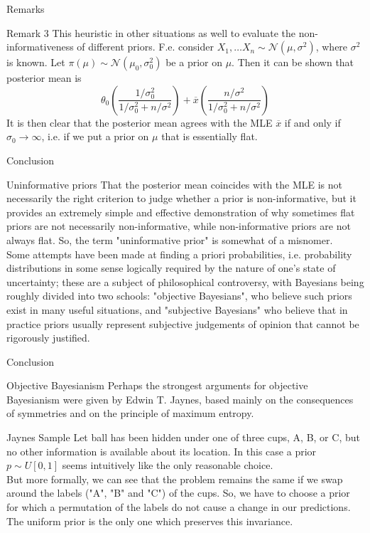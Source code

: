 \documentclass{beamer}
\begin{document}
\begin{frame}{Remarks}
    \begin{block}{Remark 3}
        This heuristic in other situations as well to evaluate the non-informativeness of different priors. F.e. consider $X_1, \ldots X_n \sim \mathcal{N}(\mu, \sigma^2)$, where $\sigma^2$ is known. Let $\pi(\mu) \sim \mathcal{N}(\mu_0, \sigma_0^2)$ be a prior on $\mu$. Then it can be shown that posterior mean is
        \[\theta_0 \left(\dfrac{1 / \sigma^2_0}{1 / \sigma^2_0 + n / \sigma^2}\right) + \overline{x} \left(\dfrac{n / \sigma^2}{1 / \sigma^2_0 + n / \sigma^2}\right)\]
        It is then clear that the posterior mean agrees with the MLE $\overline{x}$ if and only if $\sigma_0 \to \infty$, i.e. if we put a prior on $\mu$ that is essentially flat. 
    \end{block}
\end{frame}

\begin{frame}{Conclusion}
    \begin{block}{Uninformative priors}
        That the posterior mean coincides with the MLE is not necessarily the right criterion to judge whether a prior is non-informative, but it provides an extremely simple and effective demonstration of why sometimes flat priors are not necessarily non-informative, while non-informative priors are not always flat. So, the term "uninformative prior" is somewhat of a misnomer. \\
        Some attempts have been made at finding a priori probabilities, i.e. probability distributions in some sense logically required by the nature of one's state of uncertainty; these are a subject of philosophical controversy, with Bayesians being roughly divided into two schools: "objective Bayesians", who believe such priors exist in many useful situations, and "subjective Bayesians" who believe that in practice priors usually represent subjective judgements of opinion that cannot be rigorously justified.
    \end{block}
\end{frame}

\begin{frame}{Conclusion}
    \begin{block}{Objective Bayesianism}
        Perhaps the strongest arguments for objective Bayesianism were given by Edwin T. Jaynes, based mainly on the consequences of symmetries and on the principle of maximum entropy.
    \end{block}
    \begin{block}{Jaynes Sample}
        Let ball has been hidden under one of three cups, A, B, or C, but no other information is available about its location. In this case a prior $p \sim U[0, 1]$ seems intuitively like the only reasonable choice. \\
        But more formally, we can see that the problem remains the same if we swap around the labels ("A", "B" and "C") of the cups. So, we have to choose a prior for which a permutation of the labels do not cause a change in our predictions. The uniform prior is the only one which preserves this invariance. 
    \end{block}
\end{frame}
\end{document}

